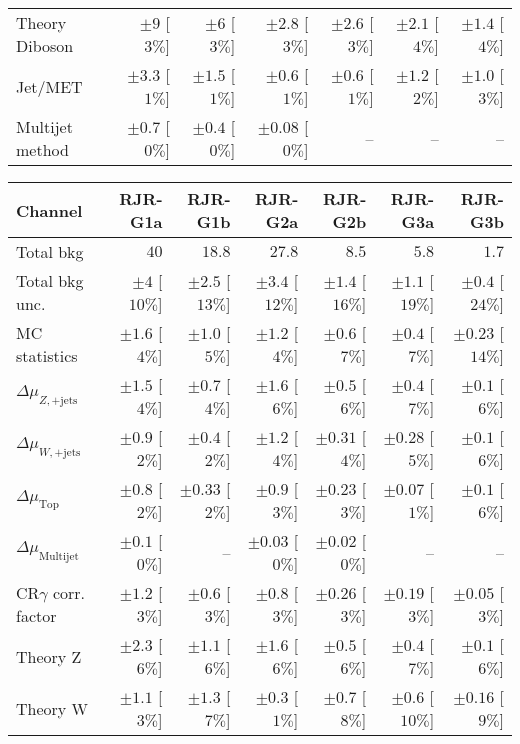 \begin{table}[hbtp]
\begin{center}
\begin{tabular}{|lrrrrrr|}
Theory Diboson  &  $\pm 9$ [$3\%$]  &  $\pm 6$ [$3\%$]  &  $\pm 2.8$ [$3\%$]  &  $\pm 2.6$ [$3\%$]  &  $\pm 2.1$ [$4\%$]  &  $\pm 1.4$ [$4\%$] \\
Jet/MET   &  $\pm 3.3$ [$1\%$]  &  $\pm 1.5$ [$1\%$]  &  $\pm 0.6$ [$1\%$]  &  $\pm 0.6$ [$1\%$]  &  $\pm 1.2$ [$2\%$]  &  $\pm 1.0$ [$3\%$] \\
Multijet method  &  $\pm 0.7$ [$0\%$]  &  $\pm 0.4$ [$0\%$]  &  $\pm 0.08$ [$0\%$]  &   --    &   --    &   --   \\
\hline
\end{tabular}

\begin{tabular}{|lrrrrrr|}
\hline
Channel  &  \textbf{ RJR-G1a } & \textbf{ RJR-G1b } & \textbf{ RJR-G2a } & \textbf{ RJR-G2b } & \textbf{ RJR-G3a } & \textbf{ RJR-G3b }  \\ \hline
Total bkg  &  $40$  &  $18.8$  &  $27.8$  &  $8.5$  &  $5.8$  &  $1.7$ \\
Total bkg unc.  &  $\pm 4$  [$10\%$]  &  $\pm 2.5$  [$13\%$]  &  $\pm 3.4$  [$12\%$]  &  $\pm 1.4$  [$16\%$]  &  $\pm 1.1$  [$19\%$]  &  $\pm 0.4$  [$24\%$] \\
\hline
MC statistics  &  $\pm 1.6$ [$4\%$]  &  $\pm 1.0$ [$5\%$]  &  $\pm 1.2$ [$4\%$]  &  $\pm 0.6$ [$7\%$]  &  $\pm 0.4$ [$7\%$]  &  $\pm 0.23$ [$14\%$] \\
$\Delta\mu_{Z,\mathrm{+jets}}$  &  $\pm 1.5$ [$4\%$]  &  $\pm 0.7$ [$4\%$]  &  $\pm 1.6$ [$6\%$]  &  $\pm 0.5$ [$6\%$]  &  $\pm 0.4$ [$7\%$]  &  $\pm 0.1$ [$6\%$] \\
$\Delta\mu_{W,\mathrm{+jets}}$  &  $\pm 0.9$ [$2\%$]  &  $\pm 0.4$ [$2\%$]  &  $\pm 1.2$ [$4\%$]  &  $\pm 0.31$ [$4\%$]  &  $\pm 0.28$ [$5\%$]  &  $\pm 0.1$ [$6\%$] \\
$\Delta\mu_{\mathrm{ Top}}$  &  $\pm 0.8$ [$2\%$]  &  $\pm 0.33$ [$2\%$]  &  $\pm 0.9$ [$3\%$]  &  $\pm 0.23$ [$3\%$]  &  $\pm 0.07$ [$1\%$]  &  $\pm 0.1$ [$6\%$] \\
$\Delta\mu_{\mathrm{ Multijet}}$  &  $\pm 0.1$ [$0\%$]  &  --  &  $\pm 0.03$ [$0\%$]  &  $\pm 0.02$ [$0\%$]  &   --    &   --   \\
CR$\gamma$ corr. factor  &  $\pm 1.2$ [$3\%$]  &  $\pm 0.6$ [$3\%$]  &  $\pm 0.8$ [$3\%$]  &  $\pm 0.26$ [$3\%$]  &  $\pm 0.19$ [$3\%$]  &  $\pm 0.05$ [$3\%$] \\
Theory Z  &  $\pm 2.3$ [$6\%$]  &  $\pm 1.1$ [$6\%$]  &  $\pm 1.6$ [$6\%$]  &  $\pm 0.5$ [$6\%$]  &  $\pm 0.4$ [$7\%$]  &  $\pm 0.1$ [$6\%$] \\
Theory W  &  $\pm 1.1$ [$3\%$]  &  $\pm 1.3$ [$7\%$]  &  $\pm 0.3$ [$1\%$]  &  $\pm 0.7$ [$8\%$]  &  $\pm 0.6$ [$10\%$]  &  $\pm 0.16$ [$9\%$] \\

\end{tabular}
\end{center}
\end{table}
